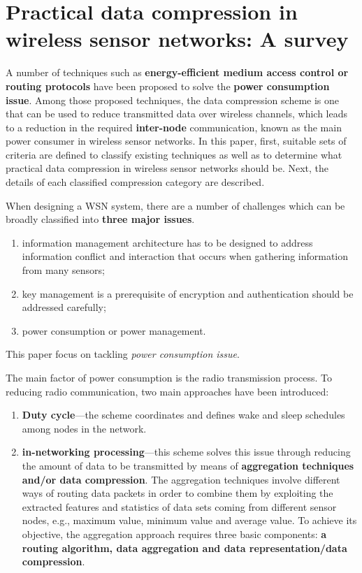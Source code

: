 \section{Practical data compression in wireless sensor networks: A survey}
A number of techniques such as \textbf{\textcolor[rgb]{1,0,0}{energy-efficient medium access control or routing protocols}} have been proposed to solve the \textbf{\textcolor[rgb]{1,0,0}{power consumption issue}}. Among those proposed techniques, the data compression scheme is one that can be used to reduce transmitted data over wireless channels, which leads to a reduction in the required \textbf{\textcolor[rgb]{1,0,0}{inter-node}} communication, known as the main power consumer in wireless sensor networks. In this paper, first, suitable sets of criteria are defined to classify existing techniques as well as to determine what practical data compression in wireless sensor networks should be. Next, the details of each classified compression category are described.

When designing a WSN system, there are a number of challenges which can be broadly classified into \textbf{\textcolor[rgb]{0,0,1}{three major issues}}.
\begin{enumerate}
    \item information management architecture has to be designed to address information conflict and interaction that occurs when gathering information from many sensors;
    \item key management is a prerequisite of encryption and authentication should be addressed carefully;
    \item power consumption or power management.
\end{enumerate}
This paper focus on tackling \emph{\textcolor[rgb]{1,0,0}{power consumption issue}}.

The main factor of power consumption is the radio transmission process. To reducing radio communication, two main approaches have been introduced:
\begin{enumerate}
    \item \textbf{\textcolor[rgb]{1,0,0}{Duty cycle}}---the scheme coordinates and defines wake and sleep schedules among nodes in the network.
    \item \textbf{\textcolor[rgb]{1,0,0}{in-networking processing}}---this scheme solves this issue through reducing the amount of data to be transmitted by means of \textbf{\textcolor[rgb]{1,0,0}{aggregation techniques and/or data compression}}. The aggregation techniques involve different ways of routing data packets in order to combine them by exploiting the extracted features and statistics of data sets coming from different sensor nodes, e.g., maximum value, minimum value and average value. To achieve its objective, the aggregation approach requires three basic components: \textbf{\textcolor[rgb]{1,0,0}{a routing algorithm, data aggregation and data representation/data compression}}.
\end{enumerate}

